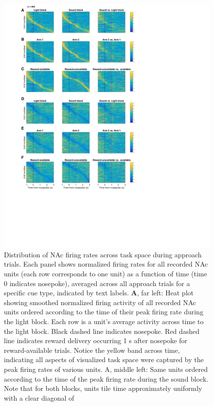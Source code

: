 \documentclass[11pt]{article}
\newcommand{\bsf}[1]{\textbf{#1}}
\begin{document}
{\begin{figure}[h]
\centering
\includegraphics[height=0.5\textheight]{Fig 12 - NP task tiling.png}
\caption{Distribution of NAc firing rates across task space during approach
  trials. Each panel shows normalized firing rates for all recorded NAc units
  (each row corresponds to one unit) as a function of time (time 0 indicates
  nosepoke), averaged across all approach trials for a specific cue type,
  indicated by text labels. \bsf{A}, far left: Heat plot showing smoothed
  normalized firing activity of all recorded NAc units ordered according to the
  time of their peak firing rate during the light block. Each row is a unit’s
  average activity across time to the light block. Black dashed line indicates
  nosepoke. Red dashed line indicates reward delivery occurring 1 s after
  nosepoke for reward-available trials. Notice the yellow band across time,
  indicating all aspects of visualized task space were captured by the peak
  firing rates of various units. A, middle left: Same units ordered according to
  the time of the peak firing rate during the sound block. Note that for both
  blocks, units tile time approximately uniformly with a clear diagonal of
}
\end{figure}}
\end{document}
